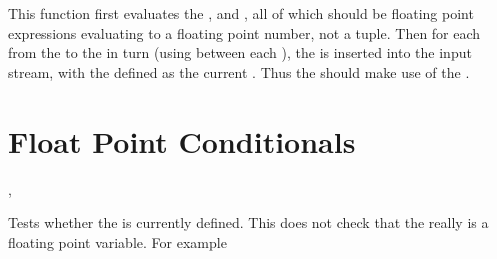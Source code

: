 \documentclass[oneside]{book}
\begin{document}
\begin{function}{\FpStepVariable}
\begin{syntax}
     
\end{syntax}
This function first evaluates the , 
and , all of which should be floating point
expressions evaluating to a floating point number, not a tuple.
Then for each  from the  to the
 in turn (using  between each
), the  is inserted into the input stream,
with the  defined as the current .  Thus
the  should make use of the .
\end{function}

\section{Float Point Conditionals}

\begin{function}{\FpIfExist,\FpIfExistTF}
\begin{syntax}
 
   
\end{syntax}
Tests whether the  is currently defined.  This does not
check that the  really is a floating point variable.
For example
\begin{demohigh}
\FpIfExistTF {} {}
\FpIfExistTF {} {}
\end{demohigh}
\end{function}
\end{document}
